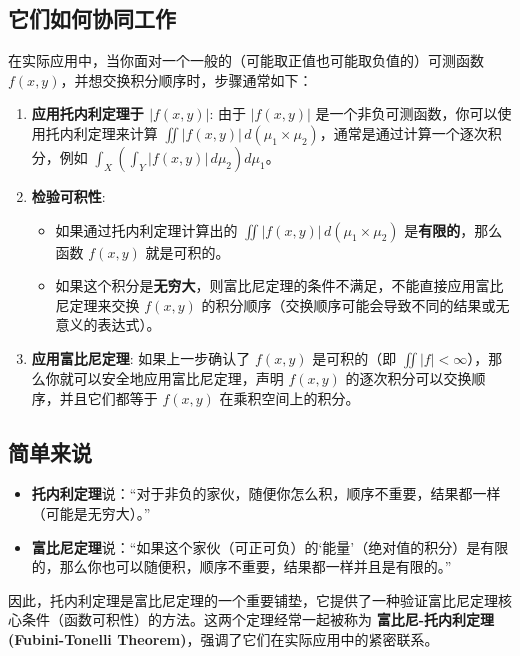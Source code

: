 \subsection{它们如何协同工作 🤝}

在实际应用中，当你面对一个一般的（可能取正值也可能取负值的）可测函数 $f(x,y)$，并想交换积分顺序时，步骤通常如下：

\begin{enumerate}
	\item \textbf{应用托内利定理于 $|f(x,y)|$}: 由于 $|f(x,y)|$ 是一个非负可测函数，你可以使用托内利定理来计算 $\iint |f(x,y)| \,d(\mu_1 \times \mu_2)$，通常是通过计算一个逐次积分，例如 $\int_X \left( \int_Y |f(x,y)| \,d\mu_2 \right) d\mu_1$。
	\item \textbf{检验可积性}:
	\begin{itemize}
		\item 如果通过托内利定理计算出的 $\iint |f(x,y)| \,d(\mu_1 \times \mu_2)$ 是\textbf{有限的}，那么函数 $f(x,y)$ 就是可积的。
		\item 如果这个积分是\textbf{无穷大}，则富比尼定理的条件不满足，不能直接应用富比尼定理来交换 $f(x,y)$ 的积分顺序（交换顺序可能会导致不同的结果或无意义的表达式）。
	\end{itemize}
	\item \textbf{应用富比尼定理}: 如果上一步确认了 $f(x,y)$ 是可积的（即 $\iint |f| < \infty$），那么你就可以安全地应用富比尼定理，声明 $f(x,y)$ 的逐次积分可以交换顺序，并且它们都等于 $f(x,y)$ 在乘积空间上的积分。
\end{enumerate}

\subsection{简单来说 🎯}

\begin{itemize}
	\item \textbf{托内利定理}说：“对于非负的家伙，随便你怎么积，顺序不重要，结果都一样（可能是无穷大）。”
	\item \textbf{富比尼定理}说：“如果这个家伙（可正可负）的‘能量’（绝对值的积分）是有限的，那么你也可以随便积，顺序不重要，结果都一样并且是有限的。”
\end{itemize}

因此，托内利定理是富比尼定理的一个重要铺垫，它提供了一种验证富比尼定理核心条件（函数可积性）的方法。这两个定理经常一起被称为 \textbf{富比尼-托内利定理 (Fubini-Tonelli Theorem)}，强调了它们在实际应用中的紧密联系。
